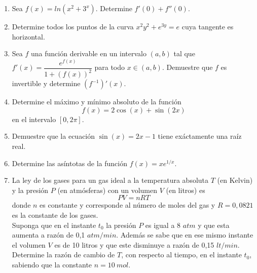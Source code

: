 \documentclass[12pt]{article}
\newenvironment{preguntas}
{\begin{enumerate}\itemsep12pt
	}
	{
	\end{enumerate}
}
\begin{document}
\begin{preguntas}
\item Sea $f(x) = ln(x^2+3^x)$. Determine $f'(0) + f''(0)$.
\item Determine todos los puntos de la curva $x^2y^2 + e^{3y} = e$ cuya tangente es horizontal.
\item Sea $f$ una función derivable en un intervalo $(a,b)$ tal que $f'(x) = \dfrac{e^{f(x)}}{1+(f(x))^2}$ para todo $x \in (a,b)$. Demuestre que $f$ es invertible y determine $(f^{-1})'(x)$.
\item Determine el máximo y mínimo absoluto de la función 
$$f(x) = 2\cos (x) + \sin (2x)$$
en el intervalo $[0, 2\pi]$.
\item Demuestre que la ecuación $\sin (x) = 2x-1$ tiene exáctamente una raíz real.
\item Determine las asíntotas de la función $f(x) = xe^{1/x}$.
\item La ley de los gases para un gas ideal a la temperatura absoluta $T$ (en Kelvin) y la presión $P$ (en atmósferas) con un volumen $V$ (en litros) es
$$PV = nRT$$
donde $n$ es constante y corresponde al número de moles del gas y $R = 0,0821$ es la constante de los gases.\\
Suponga que en el instante $t_0$ la presión $P$ es igual a 8 $atm$ y que esta aumenta a razón de 0,1 $atm/min$. Además se sabe que en ese mismo instante el volumen $V$ es de 10 litros y que este disminuye a razón de 0,15 $lt/min$.\\
Determine la razón de cambio de $T$, con respecto al tiempo, en el instante $t_0$, sabiendo que la constante $n = 10\ mol$.
\end{preguntas}
\end{document}
